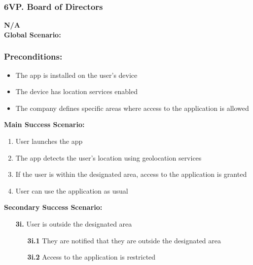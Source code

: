 \documentclass[]{article}
\begin{document}
\subsubsection*{6VP. Board of Directors}
\textbf{N/A}\\

\noindent \textbf{Global Scenario:}
\subsubsection*{Preconditions:}
\begin{itemize}
	\item The app is installed on the user's device
	\item The device has location services enabled
	\item The company defines specific areas where access to the application is allowed
\end{itemize}
\textbf{Main Success Scenario:}
\begin{enumerate}
	\item User launches the app
	\item The app detects the user's location using geolocation services
	\item If the user is within the designated area, access to the application is granted
	\item User can use the application as usual
\end{enumerate}
\textbf{Secondary Success Scenario:}
\begin{enumerate}
	\item[\textbf{3i.}] User is outside the designated area
		\begin{enumerate}
			\item[\textbf{3i.1}] They are notified that they are outside the designated area
			\item[\textbf{3i.2}] Access to the application is restricted
		\end{enumerate}
\end{enumerate}
\end{document}
